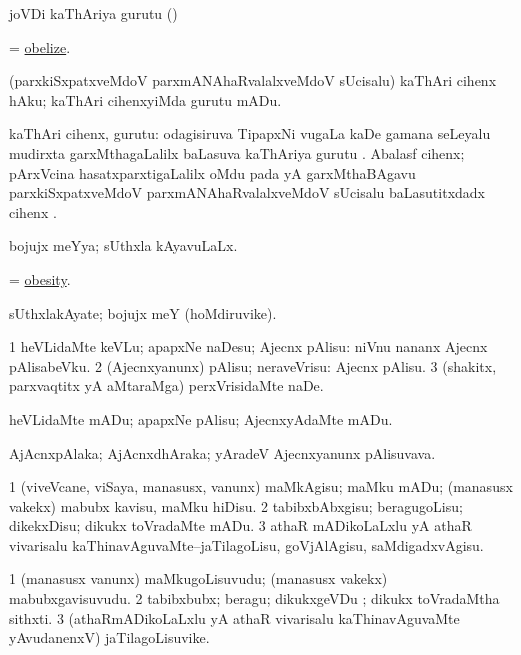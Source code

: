\noindent
\gl{\pagu}
\bmng
{} joVDi kaThAriya gurutu (\eng{$\neq$}) 
\emng
\eentry

\bentry
{}
\gl{\sakirx}
\bmng
= \hyperlink{obelize}{obelize}. 
\emng
\eentry

\bentry
{}
\gl{\sakirx}
\bmng
(parxkiSxpatxveMdoV parxmANAhaRvalalxveMdoV sUcisalu) kaThAri cihenx hAku; kaThAri cihenxyiMda gurutu mADu. 
\emng
\eentry

\bentry
{}
\gl{\nA}
\bmng
kaThAri cihenx, gurutu: 
\banum
{} odagisiruva TipapxNi \mo vugaLa kaDe gamana seLeyalu mudirxta garxMthagaLalilx baLasuva kaThAriya gurutu \eng{$(\dagger)$}. 
 Abalasf cihenx; pArxVcina hasatxparxtigaLalilx oMdu pada yA garxMthaBAgavu parxkiSxpatxveMdoV parxmANAhaRvalalxveMdoV sUcisalu baLasutitxdadx cihenx \eng{$(-, \div)$}. 
\eanum
\emng
\eentry

\bentry
{}
\gl{\gu}
\bmng
bojujx meYya; sUthxla kAyavuLaLx. 
\emng
\eentry

\bentry
{}
\gl{\nA}
\bmng
= \hyperlink{obesity}{obesity}. 
\emng
\eentry

\bentry
{}
\gl{\nA}
\bmng
sUthxlakAyate; bojujx meY (hoMdiruvike). 
\emng
\eentry

\bentry
{}
\gl{\sakirx}
\bmng
\bnum
\num{1} heVLidaMte keVLu; apapxNe naDesu; Ajecnx pAlisu:  niVnu nananx Ajecnx pAlisabeVku. 
\num{2} (Ajecnxyanunx) pAlisu; neraveVrisu:  Ajecnx pAlisu. 
\num{3} (shakitx, parxvaqtitx yA aMtaraMga) perxVrisidaMte naDe. 
\enum
\emng

\noindent
\gl{\akirx}
\bmng
heVLidaMte mADu; apapxNe pAlisu; AjecnxyAdaMte mADu. 
\emng
\eentry

\bentry
{}
\gl{\nA}
\bmng
AjAcnxpAlaka; AjAcnxdhAraka; yAradeV Ajecnxyanunx pAlisuvava. 
\emng
\eentry

\bentry
{}
\gl{\sakirx}
\bmng
\bnum
\num{1} (viveVcane, viSaya, manasusx, \mo vanunx) maMkAgisu; maMku mADu; (manasusx \mo vakekx) mabubx kavisu, maMku hiDisu. 
\num{2} tabibxbAbxgisu; beragugoLisu; dikekxDisu; dikukx toVradaMte mADu. 
\num{3} athaR mADikoLaLxlu yA athaR vivarisalu kaThinavAguvaMte--jaTilagoLisu, goVjAlAgisu, saMdigadxvAgisu. 
\enum
\emng
\eentry

\bentry
{}
\gl{\nA}
\bmng
\bnum
\num{1} (manasusx \mo vanunx) maMkugoLisuvudu; (manasusx \mo vakekx) mabubxgavisuvudu. 
\num{2} tabibxbubx; beragu; dikukxgeVDu ; dikukx toVradaMtha sithxti. 
\num{3} (athaRmADikoLaLxlu yA athaR vivarisalu kaThinavAguvaMte yAvudanenxV) jaTilagoLisuvike. 
\enum
\emng
\eentry

